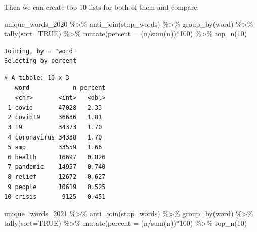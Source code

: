\documentclass[
  letterpaper,
  DIV=11,
  numbers=noendperiod]{scrreprt}
\newenvironment{Shaded}{\begin{snugshade}}{\end{snugshade}}
\newcommand{\AttributeTok}[1]{\textcolor[rgb]{0.40,0.45,0.13}{#1}}
\newcommand{\ConstantTok}[1]{\textcolor[rgb]{0.56,0.35,0.01}{#1}}
\newcommand{\DecValTok}[1]{\textcolor[rgb]{0.68,0.00,0.00}{#1}}
\newcommand{\FunctionTok}[1]{\textcolor[rgb]{0.28,0.35,0.67}{#1}}
\newcommand{\NormalTok}[1]{\textcolor[rgb]{0.00,0.23,0.31}{#1}}
\newcommand{\SpecialCharTok}[1]{\textcolor[rgb]{0.37,0.37,0.37}{#1}}
\begin{document}
Then we can create top 10 lists for both of them and compare:

\begin{Shaded}
\begin{Highlighting}[]
\NormalTok{unique\_words\_2020 }\SpecialCharTok{\%\textgreater{}\%}
  \FunctionTok{anti\_join}\NormalTok{(stop\_words) }\SpecialCharTok{\%\textgreater{}\%}
  \FunctionTok{group\_by}\NormalTok{(word) }\SpecialCharTok{\%\textgreater{}\%}
  \FunctionTok{tally}\NormalTok{(}\AttributeTok{sort=}\ConstantTok{TRUE}\NormalTok{) }\SpecialCharTok{\%\textgreater{}\%}
  \FunctionTok{mutate}\NormalTok{(}\AttributeTok{percent =}\NormalTok{ (n}\SpecialCharTok{/}\FunctionTok{sum}\NormalTok{(n))}\SpecialCharTok{*}\DecValTok{100}\NormalTok{) }\SpecialCharTok{\%\textgreater{}\%}
  \FunctionTok{top\_n}\NormalTok{(}\DecValTok{10}\NormalTok{)}
\end{Highlighting}
\end{Shaded}

\begin{verbatim}
Joining, by = "word"
Selecting by percent
\end{verbatim}

\begin{verbatim}
# A tibble: 10 x 3
   word            n percent
   <chr>       <int>   <dbl>
 1 covid       47028   2.33 
 2 covid19     36636   1.81 
 3 19          34373   1.70 
 4 coronavirus 34338   1.70 
 5 amp         33559   1.66 
 6 health      16697   0.826
 7 pandemic    14957   0.740
 8 relief      12672   0.627
 9 people      10619   0.525
10 crisis       9125   0.451
\end{verbatim}

\begin{Shaded}
\begin{Highlighting}[]
\NormalTok{unique\_words\_2021 }\SpecialCharTok{\%\textgreater{}\%}
  \FunctionTok{anti\_join}\NormalTok{(stop\_words) }\SpecialCharTok{\%\textgreater{}\%}
  \FunctionTok{group\_by}\NormalTok{(word) }\SpecialCharTok{\%\textgreater{}\%}
  \FunctionTok{tally}\NormalTok{(}\AttributeTok{sort=}\ConstantTok{TRUE}\NormalTok{) }\SpecialCharTok{\%\textgreater{}\%}
  \FunctionTok{mutate}\NormalTok{(}\AttributeTok{percent =}\NormalTok{ (n}\SpecialCharTok{/}\FunctionTok{sum}\NormalTok{(n))}\SpecialCharTok{*}\DecValTok{100}\NormalTok{) }\SpecialCharTok{\%\textgreater{}\%}
  \FunctionTok{top\_n}\NormalTok{(}\DecValTok{10}\NormalTok{)}
\end{Highlighting}
\end{Shaded}
\end{document}
